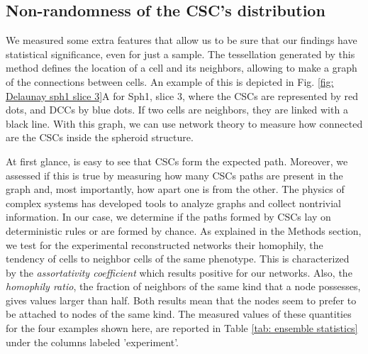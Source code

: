 \documentclass[fleqn,10pt]{wlscirep}
\begin{document}
\subsection*{Non-randomness of the CSC's distribution}

We measured some extra features that allow us to be sure that our findings have statistical significance, even for just a sample. The tessellation generated by this method defines the location of a cell and its neighbors, allowing to make a graph of the connections between cells. An example of this is depicted in Fig. \ref{fig: Delaunay sph1 slice 3}A  for {\textsf Sph1, slice 3}, where the CSCs are represented by red dots, and DCCs by blue dots. If two cells are neighbors, they are linked with a black line. With this graph, we can use network theory to measure how connected are the CSCs inside the spheroid structure. 

At first glance, is easy to see that CSCs form the expected path. Moreover, we assessed if this is true by measuring how many CSCs paths are present in the graph and, most importantly, how apart one is from the other. The physics of complex systems has developed tools to analyze graphs and collect nontrivial information. In our case, we determine if the paths formed by CSCs lay on deterministic rules or are formed by chance. As explained in the Methods section,  we test for the experimental reconstructed networks their homophily, the tendency of cells to neighbor cells of the same phenotype. This is characterized by the \emph{assortativity coefficient} which results positive for our networks. Also, the \emph{homophily ratio}, the fraction of neighbors of the same kind that a node possesses, gives values larger than half. Both results mean that the nodes seem to prefer to be attached to nodes of the same kind. The measured values of these quantities for the four examples shown here, are reported in Table \ref{tab: ensemble statistics} under the columns labeled 'experiment'.   
\end{document}
